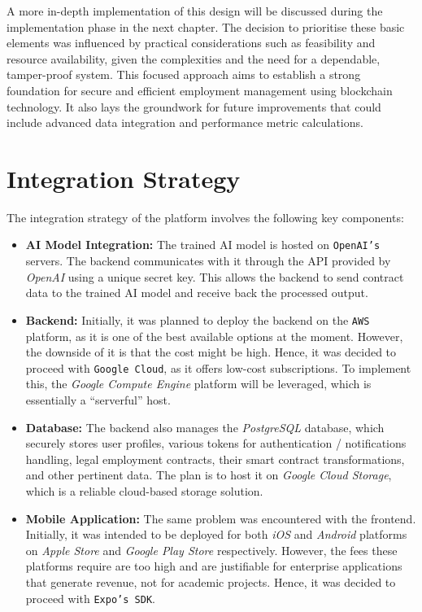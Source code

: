 A more in-depth implementation of this design will be discussed during the implementation phase in the next chapter. The decision to prioritise these basic elements was influenced by practical considerations such as feasibility and resource availability, given the complexities and the need for a dependable, tamper-proof system. This focused approach aims to establish a strong foundation for secure and efficient employment management using blockchain technology. It also lays the groundwork for future improvements that could include advanced data integration and performance metric calculations.

\section{Integration Strategy}

The integration strategy of the platform involves the following key components:

\begin{itemize}
    \item \textbf{AI Model Integration:} The trained AI model is hosted on \texttt{OpenAI's} servers. The backend communicates with it through the API provided by \textit{OpenAI} using a unique secret key. This allows the backend to send contract data to the trained AI model and receive back the processed output.
    \item \textbf{Backend:} Initially, it was planned to deploy the backend on the \texttt{AWS} platform, as it is one of the best available options at the moment. However, the downside of it is that the cost might be high. Hence, it was decided to proceed with \texttt{Google Cloud}, as it offers low-cost subscriptions. To implement this, the \textit{Google Compute Engine} platform will be leveraged, which is essentially a ``serverful'' host.
    \item \textbf{Database:} The backend also manages the \textit{PostgreSQL} database, which securely stores user profiles, various tokens for authentication / notifications handling, legal employment contracts, their smart contract transformations, and other pertinent data. The plan is to host it on \textit{Google Cloud Storage}, which is a reliable cloud-based storage solution.
    \item \textbf{Mobile Application:} The same problem was encountered with the frontend. Initially, it was intended to be deployed for both \textit{iOS} and \textit{Android} platforms on \textit{Apple Store} and \textit{Google Play Store} respectively. However, the fees these platforms require are too high and are justifiable for enterprise applications that generate revenue, not for academic projects. Hence, it was decided to proceed with \texttt{Expo's SDK}.
\end{itemize}